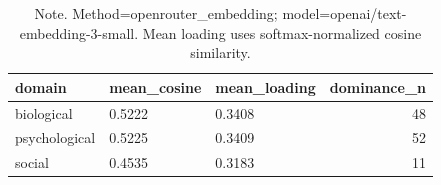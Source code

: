 \begin{table}[htbp]
\raggedright
\caption{Ontology-based semantic loading summary across BPS domains.}
\label{tab.semantic.summary}
\begin{tabular}{lllr}
\toprule
domain & mean\_cosine & mean\_loading & dominance\_n \\
\midrule
biological & 0.5222 & 0.3408 & 48 \\
psychological & 0.5225 & 0.3409 & 52 \\
social & 0.4535 & 0.3183 & 11 \\
\bottomrule
\end{tabular}

\caption*{Note. Method=openrouter\_embedding; model=openai/text-embedding-3-small. Mean loading uses softmax-normalized cosine similarity.}
\end{table}
